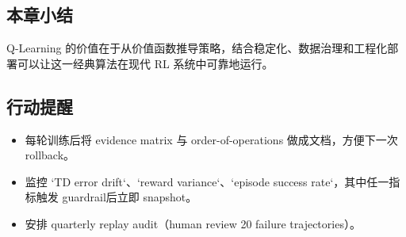 \subsection{本章小结}

Q-Learning 的价值在于从价值函数推导策略，结合稳定化、数据治理和工程化部署可以让这一经典算法在现代 RL 系统中可靠地运行。

\subsection{行动提醒}

\begin{itemize}
    \item 每轮训练后将 evidence matrix 与 order-of-operations 做成文档，方便下一次 rollback。
    \item 监控 `TD error drift`、`reward variance`、`episode success rate`，其中任一指标触发 guardrail后立即 snapshot。
    \item 安排 quarterly replay audit（human review 20 failure trajectories）。
\end{itemize}


